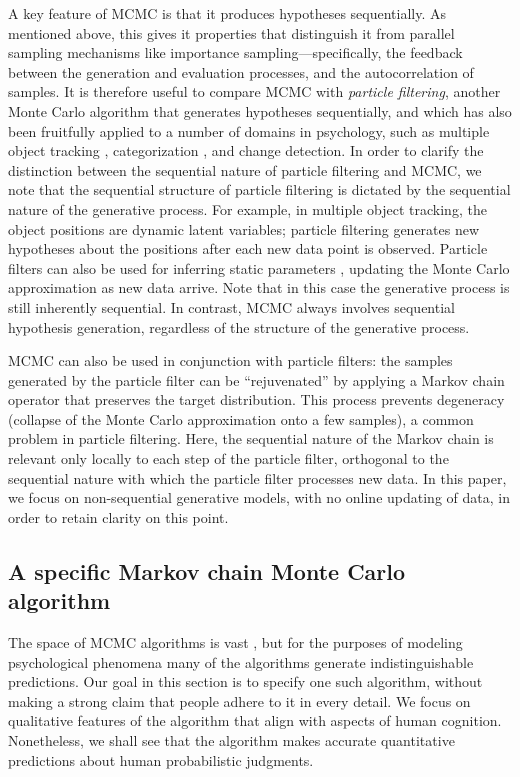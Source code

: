 A key feature of MCMC is that it produces hypotheses sequentially. As mentioned above, this gives it properties that distinguish it from parallel sampling mechanisms like importance sampling---specifically, the feedback between the generation and evaluation processes, and the autocorrelation of samples. It is therefore useful to 
compare MCMC with \emph{particle filtering}, another Monte Carlo algorithm that generates hypotheses sequentially, and which has also been fruitfully applied to a number of domains in psychology, such as multiple object tracking \citep{vul2009explaining}, categorization \citep{sanborn2010rational}, and change detection.\citep{brown09} In order to clarify the distinction between the sequential nature of particle filtering and MCMC, we note that the sequential structure of particle filtering is dictated by the sequential nature of the generative process. For example, in multiple object tracking, the object positions are dynamic latent variables; particle filtering generates new hypotheses about the positions after each new data point is observed. Particle filters can also be used for inferring static parameters \citep{chopin2002sequential}, updating the Monte Carlo approximation as new data arrive. Note that in this case the generative process is still inherently sequential. In contrast, MCMC always involves sequential hypothesis generation, regardless of the structure of the generative process.

MCMC can also be used in conjunction with particle filters: the samples generated by the particle filter can be ``rejuvenated'' by applying a Markov chain operator that preserves the target distribution.\citep{Abbott2011ExploringLearning,thaker2017online} This process prevents degeneracy (collapse of the Monte Carlo approximation onto a few samples), a common problem in particle filtering. Here, the sequential nature of the Markov chain is relevant only locally to each step of the particle filter, orthogonal to the sequential nature with which the particle filter processes new data. In this paper, we focus on non-sequential generative models, with no online updating of data, in order to retain clarity on this point.

\subsection{A specific Markov chain Monte Carlo algorithm}

The space of MCMC algorithms is vast \citep{robert13}, but for the purposes of modeling psychological phenomena many of the algorithms generate indistinguishable predictions. Our goal in this section is to specify one such algorithm, without making a strong claim that people adhere to it in every detail. We focus on qualitative features of the algorithm that align with aspects of human cognition. Nonetheless, we shall see that the algorithm makes accurate quantitative predictions about human probabilistic judgments.

